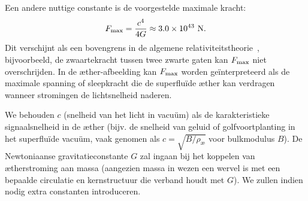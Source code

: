 Een andere nuttige constante is de voorgestelde maximale kracht:
\[
    F_{\rm max} = \frac{c^4}{4G} \approx 3.0\times10^{43}\ \text{N}.
\]
Dit verschijnt als een bovengrens in de algemene relativiteitstheorie~\cite{Schiller2022-maxforce}, bijvoorbeeld, de zwaartekracht tussen twee zwarte gaten kan $F_{\rm max}$ niet overschrijden. In de æther-afbeelding kan $F_{\rm max}$ worden geïnterpreteerd als de maximale spanning of sleepkracht die de superfluïde æther kan verdragen wanneer stromingen de lichtsnelheid naderen.

We behouden $c$ (snelheid van het licht in vacuüm) als de karakteristieke signaalsnelheid in de æther (bijv. de snelheid van geluid of golfvoortplanting in het superfluïde vacuüm, vaak genomen als $c = \sqrt{B/\rho_{\text{\ae}}}$ voor bulkmodulus $B$). De Newtoniaanse gravitatieconstante $G$ zal ingaan bij het koppelen van ætherstroming aan massa (aangezien massa in wezen een wervel is met een bepaalde circulatie en kernstructuur die verband houdt met $G$). We zullen indien nodig extra constanten introduceren.